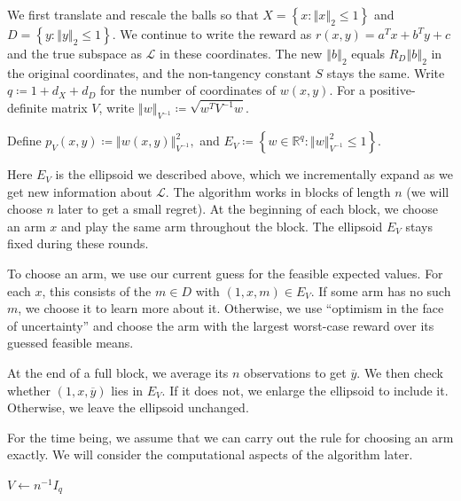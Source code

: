 {
We first translate and rescale the balls so that
$X = \left\{ x : {\left\Vert x \right\Vert}_{2} \le 1 \right\}$ and $D = \left\{ y : {\left\Vert y \right\Vert}_{2} \le 1 \right\}$. We continue to write the
reward as $r \left( x , y \right) = a^{T} x + b^{T} y + c$ and the true subspace as $\mathcal{L}$ in
these coordinates. The new ${\left\Vert b \right\Vert}_{2}$ equals $R_{D} {\left\Vert b \right\Vert}_{2}$ in the
original coordinates, and the non-tangency constant $S$ stays the same.
Write $q \coloneqq 1 + d_{X} + d_{D}$ for the number of coordinates of $w \left( x , y \right)$.
For a positive-definite matrix $V$, write
${\left\Vert w \right\Vert}_{V^{- 1}} \coloneqq \sqrt{w^{T} V^{- 1} w}$.


Define $p_{V} \left( x , y \right) \coloneqq {\left\Vert w \left( x , y \right) \right\Vert}_{V^{- 1}}^{2} ,$ and $E_{V} \coloneqq \left\{ w \in \mathbb{R}^{q} : {\left\Vert w \right\Vert}_{V^{- 1}}^{2} \le 1 \right\} .$


Here $E_{V}$ is the ellipsoid we described above, which we incrementally
expand as we get new information about $\mathcal{L}$.
The algorithm works in blocks of length $n$ (we will choose $n$ later
to get a small regret). At the beginning of each block, we choose an
arm $x$ and play the same arm throughout the block.
The ellipsoid $E_{V}$ stays fixed during these rounds.

To choose an arm, we use our current guess for the feasible expected values. For each $x$, this consists of the $m \in D$ with
$\left( 1 , x , m \right) \in E_{V}$. If some arm has no such $m$, we choose it to learn
more about it. Otherwise, we use ``optimism in the face of uncertainty'' and choose the arm with the largest worst-case
reward over its guessed feasible means.

At the end of a full block, we average its $n$ observations to get
$\overline{y}$. We then check whether $\left( 1 , x , \overline{y} \right)$ lies in $E_{V}$.
If it does not, we enlarge the ellipsoid to include it. Otherwise, we
leave the ellipsoid unchanged.

For the time being, we assume that we can carry out the rule for
choosing an arm exactly. We will consider the computational aspects
of the algorithm later.


\begin{algorithm2e}
\caption{}\label{alg:hard-ellipsoid-warmup}
$V\leftarrow n^{-1}I_q$\;
\end{algorithm2e}
\FloatBarrier

}
